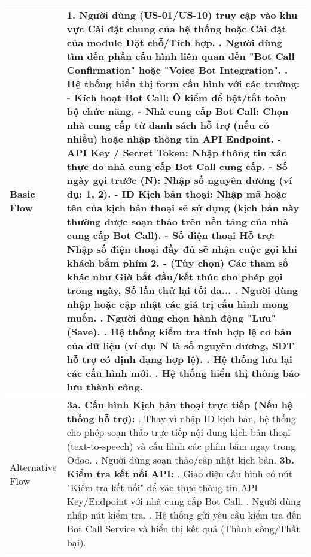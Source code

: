 \begin{longtable}{|m{4cm}|p{11cm}|}
Basic Flow & 1. Người dùng (US-01/US-10) truy cập vào khu vực Cài đặt chung của hệ thống hoặc Cài đặt của module Đặt chỗ/Tích hợp. \newline 2. Người dùng tìm đến phần cấu hình liên quan đến "Bot Call Confirmation" hoặc "Voice Bot Integration". \newline 3. Hệ thống hiển thị form cấu hình với các trường: \newline    - \textbf{Kích hoạt Bot Call:} Ô kiểm để bật/tắt toàn bộ chức năng. \newline    - \textbf{Nhà cung cấp Bot Call:} Chọn nhà cung cấp từ danh sách hỗ trợ (nếu có nhiều) hoặc nhập thông tin API Endpoint. \newline    - \textbf{API Key / Secret Token:} Nhập thông tin xác thực do nhà cung cấp Bot Call cung cấp. \newline    - \textbf{Số ngày gọi trước (N):} Nhập số nguyên dương (ví dụ: 1, 2). \newline    - \textbf{ID Kịch bản thoại:} Nhập mã hoặc tên của kịch bản thoại sẽ sử dụng (kịch bản này thường được soạn thảo trên nền tảng của nhà cung cấp Bot Call). \newline    - \textbf{Số điện thoại Hỗ trợ:} Nhập số điện thoại đầy đủ sẽ nhận cuộc gọi khi khách bấm phím 2. \newline    - (Tùy chọn) Các tham số khác như Giờ bắt đầu/kết thúc cho phép gọi trong ngày, Số lần thử lại tối đa... \newline 4. Người dùng nhập hoặc cập nhật các giá trị cấu hình mong muốn. \newline 5. Người dùng chọn hành động "Lưu" (Save). \newline 6. Hệ thống kiểm tra tính hợp lệ cơ bản của dữ liệu (ví dụ: N là số nguyên dương, SĐT hỗ trợ có định dạng hợp lệ). \newline 7. Hệ thống lưu lại các cấu hình mới. \newline 8. Hệ thống hiển thị thông báo lưu thành công. \\
\hline
Alternative Flow & \textbf{3a. Cấu hình Kịch bản thoại trực tiếp (Nếu hệ thống hỗ trợ):} \newline    1. Thay vì nhập ID kịch bản, hệ thống cho phép soạn thảo trực tiếp nội dung kịch bản thoại (text-to-speech) và cấu hình các phím bấm ngay trong Odoo. \newline    2. Người dùng soạn thảo/cập nhật kịch bản. \newline \textbf{3b. Kiểm tra kết nối API:} \newline    1. Giao diện cấu hình có nút "Kiểm tra kết nối" để xác thực thông tin API Key/Endpoint với nhà cung cấp Bot Call. \newline    2. Người dùng nhấp nút kiểm tra. \newline    3. Hệ thống gửi yêu cầu kiểm tra đến Bot Call Service và hiển thị kết quả (Thành công/Thất bại). \\

\end{longtable}
